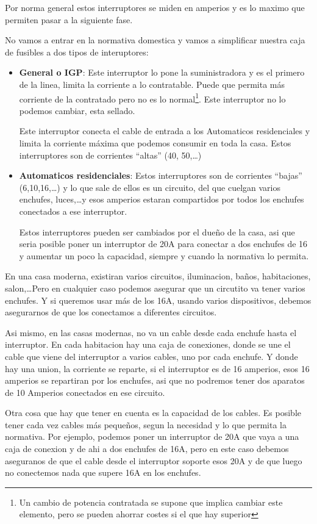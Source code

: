 Por norma general estos interruptores se miden en amperios y es lo maximo que permiten pasar a la siguiente fase.

No vamos a entrar en la normativa domestica y vamos a simplificar nuestra caja de fusibles a dos tipos de interuptores:
\begin{itemize}
\item \textbf{General o IGP}: Este interruptor lo pone la suministradora y es el primero de la linea, limita la corriente a lo contratable. Puede que permita más corriente de la contratado pero no es lo normal\footnote{Un cambio de potencia contratada se supone que implica cambiar este elemento, pero se pueden ahorrar costes si el que hay superior}. Este interruptor no lo podemos cambiar, esta sellado. 

Este interruptor conecta el cable de entrada a los Automaticos residenciales y limita la corriente máxima que podemos consumir en toda la casa. Estos interruptores son de corrientes ``altas'' (40, 50,\dots)
\item \textbf{Automaticos residenciales}: Estos interruptores son de corrientes ``bajas'' (6,10,16,\dots) y lo que sale de ellos es un circuito, del que cuelgan varios enchufes, luces,\dots y esos amperios estaran compartidos por todos los enchufes conectados a ese interruptor.

Estos interruptores pueden ser cambiados por el dueño de la casa, asi que seria posible poner un interruptor de 20A para conectar a dos enchufes de 16 y aumentar un poco la capacidad, siempre y cuando la normativa lo permita.
\end{itemize}

En una casa moderna, existiran varios circuitos, iluminacion, baños, habitaciones, salon,\dots Pero en cualquier caso podemos asegurar que un circutito va tener varios enchufes. Y si queremos usar más de los 16A, usando varios dispositivos, debemos asegurarnos de que los conectamos a diferentes circuitos.

Asi mismo, en las casas modernas, no va un cable desde cada enchufe hasta el interruptor. En cada habitacion hay una caja de conexiones, donde se une el cable que viene del interruptor a varios cables, uno por cada enchufe. Y donde hay una union, la corriente se reparte, si el interruptor es de 16 amperios, esos 16 amperios se repartiran por los enchufes, asi que no podremos tener dos aparatos de 10 Amperios conectados en ese circuito.

Otra cosa que hay que tener en cuenta es la capacidad de los cables. Es posible tener cada vez cables más pequeños, segun la necesidad y lo que permita la normativa. Por ejemplo, podemos poner un interruptor de 20A que vaya a una caja de conexion y de ahi a dos enchufes de 16A, pero en este caso debemos aseguranos de que el cable desde el interruptor soporte esos 20A y de que luego no conectemos nada que supere 16A en los enchufes.

